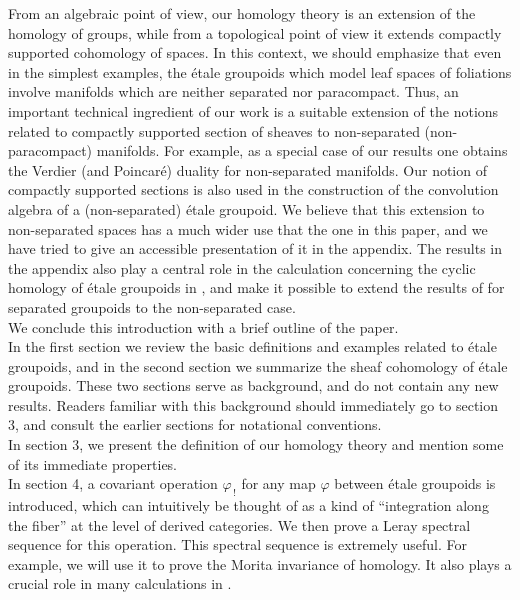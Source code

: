 \documentclass[a4paper]{article}
\newcommand{\f}{\ensuremath{\varphi}}
\begin{document}
\hspace*{.3in}  From an algebraic point of view, our homology theory is an extension of the homology of groups, while from a topological point of view it extends compactly supported cohomology of spaces. In this context, we should emphasize that even in the simplest examples, the \'etale groupoids which model leaf spaces of foliations involve manifolds which are neither separated nor paracompact. Thus, an important technical ingredient of our work is a suitable extension of the notions related to compactly supported section of sheaves to non-separated (non-paracompact) manifolds. For example, as a special case of our results one obtains the Verdier (and Poincar\'e) duality for non-separated manifolds. Our notion of compactly supported sections is also used in the construction of the convolution algebra of a (non-separated) \'etale groupoid. We believe that this extension to non-separated spaces has a much wider use that the one in this paper, and we have tried to give an accessible presentation of it in the appendix. The results in the appendix also play a central role in the calculation concerning the cyclic homology of \'etale groupoids in \cite{Cra}, and make it possible to extend the results of \cite{BrNi} for separated groupoids to the non-separated case.\\
\hspace*{.3in} We conclude this introduction with a brief outline of the paper.\\
\hspace*{.3in} In the first section we review the basic definitions and examples related to \'etale groupoids, and in the second section we summarize the sheaf cohomology of \'etale groupoids. These two sections serve as background, and do not contain any new results. Readers familiar with this background should immediately go to section 3, and consult the earlier sections for notational conventions.\\
\hspace*{.3in} In section 3, we present the definition of our homology theory and mention some of its immediate properties.\\
\hspace*{.3in} In section 4, a covariant operation $\f_{\, !}$ for any map $\f$ between \'etale groupoids is introduced, which can intuitively be thought of as a kind of ``integration along the fiber'' at the level of derived categories. We then prove a Leray spectral sequence for this operation. This spectral sequence is extremely useful. For example, we will use it to prove the Morita invariance of homology. It also plays a crucial role in many calculations in \cite{Cra}.\\
\end{document}
